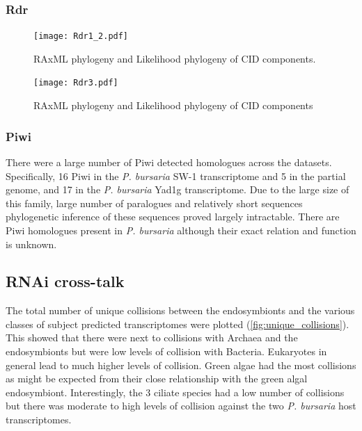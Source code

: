 \subsubsection{Rdr}

\begin{figure}
    \texttt{[image: Rdr1\_2.pdf]}
    \caption[Phylogeny of Cid Sequences]{RAxML
        phylogeny 
    and Likelihood phylogeny of CID components.}

    \label{fig:rdr_phylo}
\end{figure}


\begin{figure}
    \texttt{[image: Rdr3.pdf]}
    \caption[Phylogeny of Cid Sequences]{RAxML
        phylogeny 
    and Likelihood phylogeny of CID components}
    \label{fig:rdr_phylo}
\end{figure}



\subsubsection{Piwi}

There were a large number of Piwi detected homologues across
the datasets. Specifically, 16 Piwi in the \textit{P. bursaria} SW-1
transcriptome and 5 in the partial genome, and 17 in the \textit{P. 
bursaria} Yad1g transcriptome.
Due to the large size of this family, large number of paralogues
and relatively short sequences phylogenetic inference
of these sequences proved largely intractable. There are Piwi
homologues present in \textit{P. bursaria} although their exact
relation and function is unknown.


\subsection{RNAi cross-talk}

The total number of unique collisions between the endosymbionts and 
the various classes of subject predicted transcriptomes were plotted
(\cref{fig:unique_collisions}).  This showed that there 
were next to collisions with Archaea and the endosymbionts but were
low levels of collision with Bacteria.  Eukaryotes in general
lead to much higher levels of collision.  Green algae
had the most collisions as might be expected from their close
relationship with the green algal endosymbiont. Interestingly,
the 3 ciliate species had a low number of collisions but there
was moderate to high levels of collision against the two
\textit{P. bursaria} host transcriptomes.

